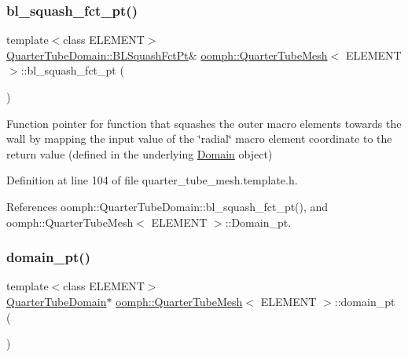 \subsubsection{\texorpdfstring{bl\+\_\+squash\+\_\+fct\+\_\+pt()}{bl\_squash\_fct\_pt()}}
{\footnotesize\ttfamily template$<$class E\+L\+E\+M\+E\+NT$>$ \\
\hyperlink{classoomph_1_1QuarterTubeDomain_a3d8c15c17d9912d8c519c028437c0b2c}{Quarter\+Tube\+Domain\+::\+B\+L\+Squash\+Fct\+Pt}\& \hyperlink{classoomph_1_1QuarterTubeMesh}{oomph\+::\+Quarter\+Tube\+Mesh}$<$ E\+L\+E\+M\+E\+NT $>$\+::bl\+\_\+squash\+\_\+fct\+\_\+pt (\begin{DoxyParamCaption}{ }\end{DoxyParamCaption})\hspace{0.3cm}{\ttfamily [inline]}}



Function pointer for function that squashes the outer macro elements towards the wall by mapping the input value of the \char`\"{}radial\char`\"{} macro element coordinate to the return value (defined in the underlying \hyperlink{classoomph_1_1Domain}{Domain} object) 



Definition at line 104 of file quarter\+\_\+tube\+\_\+mesh.\+template.\+h.



References oomph\+::\+Quarter\+Tube\+Domain\+::bl\+\_\+squash\+\_\+fct\+\_\+pt(), and oomph\+::\+Quarter\+Tube\+Mesh$<$ E\+L\+E\+M\+E\+N\+T $>$\+::\+Domain\+\_\+pt.

\mbox{\label{classoomph_1_1QuarterTubeMesh_a5629c3a0d3f8a60165fb7024b851e3e3}} 
\subsubsection{\texorpdfstring{domain\+\_\+pt()}{domain\_pt()}\hspace{0.1cm}{\footnotesize\ttfamily [1/2]}}
{\footnotesize\ttfamily template$<$class E\+L\+E\+M\+E\+NT$>$ \\
\hyperlink{classoomph_1_1QuarterTubeDomain}{Quarter\+Tube\+Domain}$\ast$ \hyperlink{classoomph_1_1QuarterTubeMesh}{oomph\+::\+Quarter\+Tube\+Mesh}$<$ E\+L\+E\+M\+E\+NT $>$\+::domain\+\_\+pt (\begin{DoxyParamCaption}{ }\end{DoxyParamCaption})\hspace{0.3cm}{\ttfamily [inline]}}



